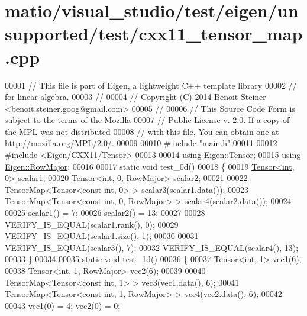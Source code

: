 \hypertarget{matio_2visual__studio_2test_2eigen_2unsupported_2test_2cxx11__tensor__map_8cpp_source}{}\section{matio/visual\+\_\+studio/test/eigen/unsupported/test/cxx11\+\_\+tensor\+\_\+map.cpp}
\label{matio_2visual__studio_2test_2eigen_2unsupported_2test_2cxx11__tensor__map_8cpp_source}

\begin{DoxyCode}
00001 \textcolor{comment}{// This file is part of Eigen, a lightweight C++ template library}
00002 \textcolor{comment}{// for linear algebra.}
00003 \textcolor{comment}{//}
00004 \textcolor{comment}{// Copyright (C) 2014 Benoit Steiner <benoit.steiner.goog@gmail.com>}
00005 \textcolor{comment}{//}
00006 \textcolor{comment}{// This Source Code Form is subject to the terms of the Mozilla}
00007 \textcolor{comment}{// Public License v. 2.0. If a copy of the MPL was not distributed}
00008 \textcolor{comment}{// with this file, You can obtain one at http://mozilla.org/MPL/2.0/.}
00009 
00010 \textcolor{preprocessor}{#include "main.h"}
00011 
00012 \textcolor{preprocessor}{#include <Eigen/CXX11/Tensor>}
00013 
00014 \textcolor{keyword}{using} \hyperlink{class_eigen_1_1_tensor}{Eigen::Tensor};
00015 \textcolor{keyword}{using} \hyperlink{group__enums_ggaacded1a18ae58b0f554751f6cdf9eb13acfcde9cd8677c5f7caf6bd603666aae3}{Eigen::RowMajor};
00016 
00017 \textcolor{keyword}{static} \textcolor{keywordtype}{void} test\_0d()
00018 \{
00019   \hyperlink{class_eigen_1_1_tensor}{Tensor<int, 0>} scalar1;
00020   \hyperlink{class_eigen_1_1_tensor}{Tensor<int, 0, RowMajor>} scalar2;
00021 
00022   TensorMap<Tensor<const int, 0> > scalar3(scalar1.data());
00023   TensorMap<Tensor<const int, 0, RowMajor> > scalar4(scalar2.data());
00024 
00025   scalar1() = 7;
00026   scalar2() = 13;
00027 
00028   VERIFY\_IS\_EQUAL(scalar1.rank(), 0);
00029   VERIFY\_IS\_EQUAL(scalar1.size(), 1);
00030 
00031   VERIFY\_IS\_EQUAL(scalar3(), 7);
00032   VERIFY\_IS\_EQUAL(scalar4(), 13);
00033 \}
00034 
00035 \textcolor{keyword}{static} \textcolor{keywordtype}{void} test\_1d()
00036 \{
00037   \hyperlink{class_eigen_1_1_tensor}{Tensor<int, 1>} vec1(6);
00038   \hyperlink{class_eigen_1_1_tensor}{Tensor<int, 1, RowMajor>} vec2(6);
00039 
00040   TensorMap<Tensor<const int, 1> > vec3(vec1.data(), 6);
00041   TensorMap<Tensor<const int, 1, RowMajor> > vec4(vec2.data(), 6);
00042 
00043   vec1(0) = 4;  vec2(0) = 0;

\end{DoxyCode}
